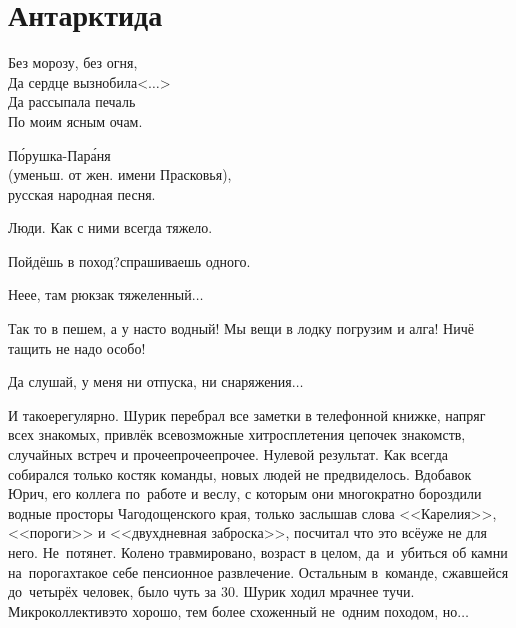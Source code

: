 {
	\chapter{Антарктида}
	\vepsianrose
	
	\fancyhead[LE]{\fancyplain{}{\bfseries \parttitle}}
	\fancyhead[RO]{\fancyplain{}{\bfseries \rightmark}}
	
	\epigraph{%
		Без морозу, без огня,\\
		Да сердце вызнобила<$\ldots$>\\
		Да рассыпала печаль\\
		По моим ясным очам.
	}	
	{
		\begin{flushright}
			\small{П\'орушка-Пар\'аня\\(уменьш. от жен. имени Прасковья),\\русская народная песня.}
		\end{flushright}
	}
	
	Люди. Как с ними всегда тяжело.
	
	\diagdash Пойдёшь в поход?\mdash спрашиваешь одного.
	
	\diagdash Не\sdash е\sdash е, там рюкзак тяжеленный$\ldots$
	
	\diagdash Так то в пешем, а у нас\sdash то водный! Мы вещи в лодку погрузим и алга! Ничё тащить не надо особо!
	
	\diagdash Да слушай, у меня ни отпуска, ни снаряжения$\ldots$
	
	И такое\mdash регулярно. Шурик перебрал все заметки в телефонной книжке, напряг всех знакомых, привлёк всевозможные хитросплетения цепочек знакомств, случайных встреч и прочее\sdash прочее\sdash прочее. Нулевой результат. Как всегда собирался только костяк команды, новых людей не предвиделось. Вдобавок Юрич, его коллега по~работе и веслу, с которым они многократно бороздили водные просторы Чагодощенского края, только заслышав слова <<Карелия>>, <<пороги>> и <<двухдневная заброска>>, посчитал что это всё\mdash уже не для него. Не~потянет. Колено травмировано, возраст в целом, да~и~убиться об камни на~порогах\mdash такое себе пенсионное развлечение. Остальным в~команде, сжавшейся до~четырёх человек, было чуть за 30. Шурик ходил мрачнее тучи. Микроколлектив\mdash это хорошо, тем более схоженный не~одним походом, но$\ldots$
	
}
